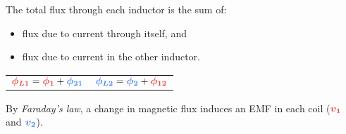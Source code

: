 \begin{multicols}{2}
\begin{CheatsheetEntryFrameMid}
        The total flux through each inductor is the sum of:
        \begin{itemize}
            \item flux due to current through itself, and
            \item flux due to current in the other inductor.
        \end{itemize}

        \begin{tabularx}{\textwidth}{CC}
            $\memphR{\phi_{L1}} = \memphR{\phi_1} + \memphB{\phi_{21}}$ &
            $\memphB{\phi_{L2}} = \memphB{\phi_2} + \memphR{\phi_{12}}$ \\
        \end{tabularx}

        By \textit{Faraday's law}, a change in magnetic flux induces an EMF in each coil ($\memphR{v_1}$ and $\memphB{v_2}$).



\end{CheatsheetEntryFrameMid}
\end{multicols}
